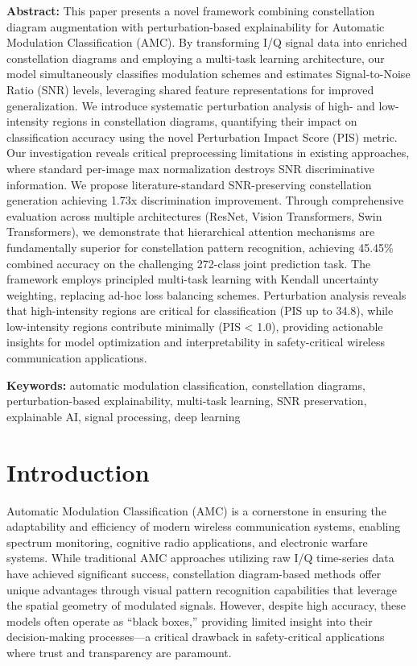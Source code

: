 \documentclass{ELSP}
\begin{document}
\noindent\textbf{\textbf{\textcolor[RGB]{0,131,255}{Abstract:}}} This paper presents a novel framework combining constellation diagram augmentation with perturbation-based explainability for Automatic Modulation Classification (AMC). By transforming I/Q signal data into enriched constellation diagrams and employing a multi-task learning architecture, our model simultaneously classifies modulation schemes and estimates Signal-to-Noise Ratio (SNR) levels, leveraging shared feature representations for improved generalization. We introduce systematic perturbation analysis of high- and low-intensity regions in constellation diagrams, quantifying their impact on classification accuracy using the novel Perturbation Impact Score (PIS) metric. Our investigation reveals critical preprocessing limitations in existing approaches, where standard per-image max normalization destroys SNR discriminative information. We propose literature-standard SNR-preserving constellation generation achieving 1.73x discrimination improvement. Through comprehensive evaluation across multiple architectures (ResNet, Vision Transformers, Swin Transformers), we demonstrate that hierarchical attention mechanisms are fundamentally superior for constellation pattern recognition, achieving 45.45\% combined accuracy on the challenging 272-class joint prediction task. The framework employs principled multi-task learning with Kendall uncertainty weighting, replacing ad-hoc loss balancing schemes. Perturbation analysis reveals that high-intensity regions are critical for classification (PIS up to 34.8), while low-intensity regions contribute minimally (PIS < 1.0), providing actionable insights for model optimization and interpretability in safety-critical wireless communication applications.

\noindent\textbf{\textcolor[RGB]{0,131,255}{Keywords:}} automatic modulation classification, constellation diagrams, perturbation-based explainability, multi-task learning, SNR preservation, explainable AI, signal processing, deep learning

\section{Introduction}

Automatic Modulation Classification (AMC) is a cornerstone in ensuring the adaptability and efficiency of modern wireless communication systems, enabling spectrum monitoring, cognitive radio applications, and electronic warfare systems. While traditional AMC approaches utilizing raw I/Q time-series data have achieved significant success, constellation diagram-based methods offer unique advantages through visual pattern recognition capabilities that leverage the spatial geometry of modulated signals. However, despite high accuracy, these models often operate as ``black boxes,'' providing limited insight into their decision-making processes—a critical drawback in safety-critical applications where trust and transparency are paramount.
\end{document}
